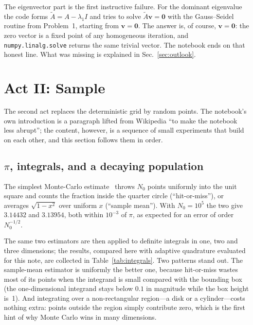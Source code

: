 \documentclass[aps,pra,twocolumn,superscriptaddress,floatfix,nofootinbib]{revtex4-2}
\begin{document}
The eigenvector part is the first instructive failure. For the dominant eigenvalue the code forms $\tilde A = A-\lambda_1 I$ and tries to solve $\tilde A\mathbf v=\mathbf 0$ with the Gauss--Seidel routine from Problem~1, starting from $\mathbf v=\mathbf 0$. The answer is, of course, $\mathbf v = \mathbf 0$: the zero vector is a fixed point of any homogeneous iteration, and \texttt{numpy.linalg.solve} returns the same trivial vector. The notebook ends on that honest line. What was missing is explained in Sec.~\ref{sec:outlook}.

\section{Act II: Sample}
\label{sec:sample}

The second act replaces the deterministic grid by random points. The notebook's own introduction is a paragraph lifted from Wikipedia ``to make the notebook less abrupt''; the content, however, is a sequence of small experiments that build on each other, and this section follows them in order.

\subsection{$\pi$, integrals, and a decaying population}

The simplest Monte-Carlo estimate~\cite{MetropolisUlam1949} throws $N_0$ points uniformly into the unit square and counts the fraction inside the quarter circle (``hit-or-miss''), or averages $\sqrt{1-x^2}$ over uniform $x$ (``sample mean''). With $N_0=10^5$ the two give $3.14432$ and $3.13954$, both within $10^{-3}$ of $\pi$, as expected for an error of order $N_0^{-1/2}$.

The same two estimators are then applied to definite integrals in one, two and three dimensions; the results, compared here with adaptive quadrature evaluated for this note, are collected in Table~\ref{tab:integrals}. Two patterns stand out. The sample-mean estimator is uniformly the better one, because hit-or-miss wastes most of its points when the integrand is small compared with the bounding box (the one-dimensional integrand stays below $0.1$ in magnitude while the box height is~1). And integrating over a non-rectangular region---a disk or a cylinder---costs nothing extra: points outside the region simply contribute zero, which is the first hint of why Monte Carlo wins in many dimensions.
\end{document}
